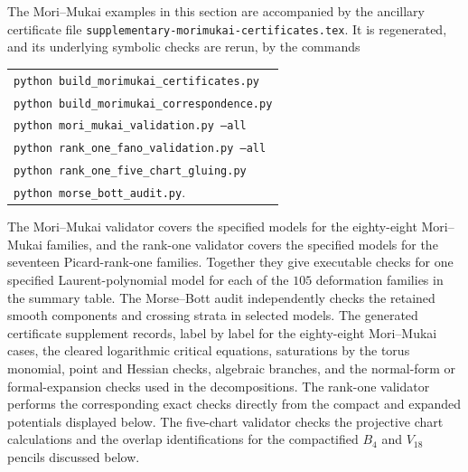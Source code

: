 \documentclass[11pt]{amsart}
\begin{document}
The Mori--Mukai examples in this section are accompanied by the ancillary certificate file \texttt{supplementary-morimukai-certificates.tex}. It is regenerated, and its underlying symbolic checks are rerun, by the commands
\begin{center}
\begin{tabular}{l}
\texttt{python build\_morimukai\_certificates.py}\\
\texttt{python build\_morimukai\_correspondence.py}\\
\texttt{python mori\_mukai\_validation.py --all}\\
\texttt{python rank\_one\_fano\_validation.py --all}\\
\texttt{python rank\_one\_five\_chart\_gluing.py}\\
\texttt{python morse\_bott\_audit.py}.
\end{tabular}
\end{center}
The Mori--Mukai validator covers the specified models for the eighty-eight
Mori--Mukai families, and the rank-one validator covers the specified models
for the seventeen Picard-rank-one families. Together they give executable
checks for one specified Laurent-polynomial model for each of the $105$
deformation families in the summary table. The Morse--Bott audit independently checks the retained smooth
components and crossing strata in selected models.  The generated certificate
supplement records, label by label for the eighty-eight Mori--Mukai cases, the
cleared logarithmic critical equations, saturations by the torus monomial,
point and Hessian checks, algebraic branches, and the normal-form or
formal-expansion checks used in the decompositions.  The rank-one validator
performs the corresponding exact checks directly from the compact and expanded
potentials displayed below.  The five-chart validator checks the projective
chart calculations and the overlap identifications for the compactified
$B_4$ and $V_{18}$ pencils discussed below.
\end{document}
